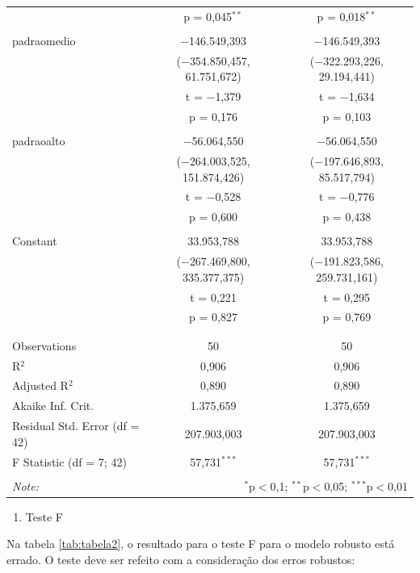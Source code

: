 \documentclass[a4paper]{article}
\providecommand{\tightlist}{%
  \setlength{\itemsep}{0pt}\setlength{\parskip}{0pt}}
\begin{document}
\begin{table}[!htbp]
\begin{tabular}{@{\extracolsep{5pt}}lcc}
  & p = 0,045$^{**}$ & p = 0,018$^{**}$ \\ 
  & & \\ 
 padraomedio & $-$146.549,393 & $-$146.549,393 \\ 
  & ($-$354.850,457, 61.751,672) & ($-$322.293,226, 29.194,441) \\ 
  & t = $-$1,379 & t = $-$1,634 \\ 
  & p = 0,176 & p = 0,103 \\ 
  & & \\ 
 padraoalto & $-$56.064,550 & $-$56.064,550 \\ 
  & ($-$264.003,525, 151.874,426) & ($-$197.646,893, 85.517,794) \\ 
  & t = $-$0,528 & t = $-$0,776 \\ 
  & p = 0,600 & p = 0,438 \\ 
  & & \\ 
 Constant & 33.953,788 & 33.953,788 \\ 
  & ($-$267.469,800, 335.377,375) & ($-$191.823,586, 259.731,161) \\ 
  & t = 0,221 & t = 0,295 \\ 
  & p = 0,827 & p = 0,769 \\ 
  & & \\ 
\hline \\[-1.8ex] 
Observations & 50 & 50 \\ 
R$^{2}$ & 0,906 & 0,906 \\ 
Adjusted R$^{2}$ & 0,890 & 0,890 \\ 
Akaike Inf. Crit. & 1.375,659 & 1.375,659 \\ 
Residual Std. Error (df = 42) & 207.903,003 & 207.903,003 \\ 
F Statistic (df = 7; 42) & 57,731$^{***}$ & 57,731$^{***}$ \\ 
\hline 
\hline \\[-1.8ex] 
\textit{Note:}  & \multicolumn{2}{r}{$^{*}$p$<$0,1; $^{**}$p$<$0,05; $^{***}$p$<$0,01} \\ 
\end{tabular} 
\end{table}

\begin{enumerate}
\def\labelenumi{\alph{enumi}.}
\setcounter{enumi}{1}
\tightlist
\item
  Teste F
\end{enumerate}

Na tabela \ref{tab:tabela2}, o resultado para o teste F para o modelo
robusto está errado. O teste deve ser refeito com a consideração dos
erros robustos:
\end{document}
